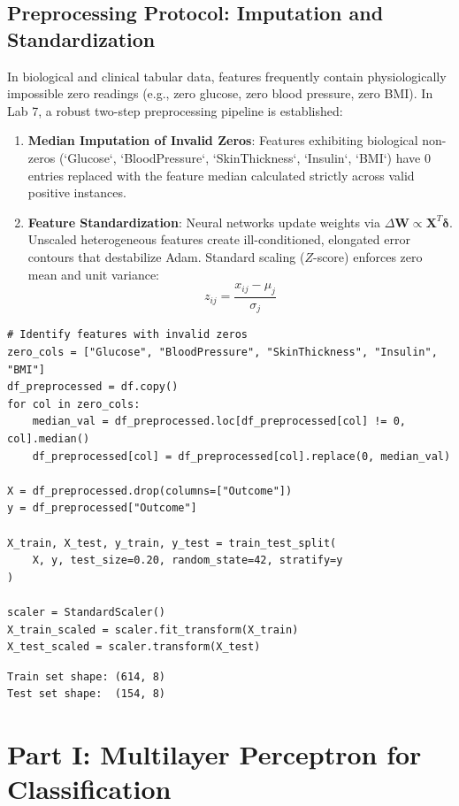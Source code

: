\documentclass[12pt]{article}
\begin{document}
\subsection{Preprocessing Protocol: Imputation and Standardization}
In biological and clinical tabular data, features frequently contain physiologically impossible zero readings (e.g., zero glucose, zero blood pressure, zero BMI). In Lab 7, a robust two-step preprocessing pipeline is established:
\begin{enumerate}
    \item \textbf{Median Imputation of Invalid Zeros}: Features exhibiting biological non-zeros (`Glucose`, `BloodPressure`, `SkinThickness`, `Insulin`, `BMI`) have $0$ entries replaced with the feature median calculated strictly across valid positive instances.
    \item \textbf{Feature Standardization}: Neural networks update weights via $\Delta \mathbf{W} \propto \mathbf{X}^T \boldsymbol{\delta}$. Unscaled heterogeneous features create ill-conditioned, elongated error contours that destabilize Adam. Standard scaling ($Z$-score) enforces zero mean and unit variance:
    \begin{equation}
        z_{ij} = \frac{x_{ij} - \mu_j}{\sigma_j}
    \end{equation}
\end{enumerate}

\begin{lstlisting}[style=code]
# Identify features with invalid zeros
zero_cols = ["Glucose", "BloodPressure", "SkinThickness", "Insulin", "BMI"]
df_preprocessed = df.copy()
for col in zero_cols:
    median_val = df_preprocessed.loc[df_preprocessed[col] != 0, col].median()
    df_preprocessed[col] = df_preprocessed[col].replace(0, median_val)

X = df_preprocessed.drop(columns=["Outcome"])
y = df_preprocessed["Outcome"]

X_train, X_test, y_train, y_test = train_test_split(
    X, y, test_size=0.20, random_state=42, stratify=y
)

scaler = StandardScaler()
X_train_scaled = scaler.fit_transform(X_train)
X_test_scaled = scaler.transform(X_test)
\end{lstlisting}

\begin{lstlisting}[style=output]
Train set shape: (614, 8)
Test set shape:  (154, 8)
\end{lstlisting}

\newpage
\section{Part I: Multilayer Perceptron for Classification}
\end{document}
